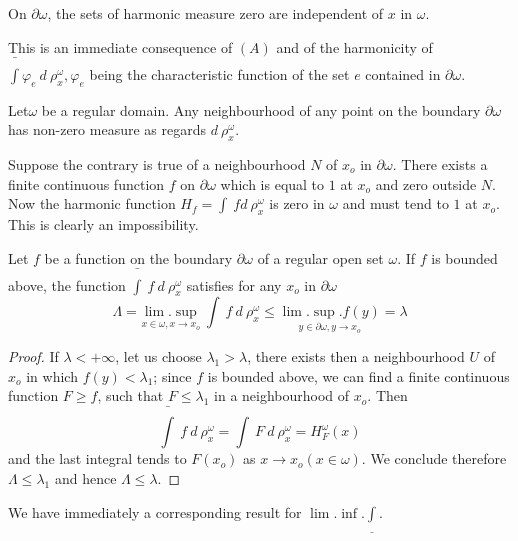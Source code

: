 \begin{coro*}%
  On $\partial \omega$, the sets of harmonic measure zero are
  independent of $x$ in $\omega$. 
\end{coro*}

This is an immediate consequence of $(A)$ and of the harmonicity of
$\bar{\int} \varphi_e ~d ~ \rho^\omega_x, \varphi_e$ being the
characteristic function of the set $e$ contained in $\partial
\omega$. 

\begin{prop}\label{p4:chap1:sec3:prop2}%
  Let\pageoriginale $\omega$ be a regular domain. Any neighbourhood of any point on
  the boundary $\partial \omega$ has non-zero measure as regards $d
  ~\rho^\omega_x$. 
\end{prop}

Suppose the contrary is true of a neighbourhood $N$ of $x_o$ in
$\partial \omega$. There exists a finite continuous function $f$ on
$\partial \omega$ which is equal to $1$ at $x_o$ and zero outside
$N$. Now the harmonic function $H_f = \int ~ fd ~ \rho^\omega_x$ is
zero in $\omega$ and must tend to $1$ at $x_o$. This is clearly an
impossibility. 

\begin{prop}\label{p4:chap1:sec3:prop3}%
  Let $f$ be a function on the boundary $\partial \omega$ of a regular
  open set $\omega$. If $f$ is bounded above, the function $\bar{\int}
  ~ f ~ d ~ \rho^\omega_x$ satisfies for any $x_o$ in $\partial
  \omega$ 
  $$
  \Lambda = \underset{x \in \omega, x \rightarrow x_o}{\lim.\sup} ~
  \int ~ f ~ d ~ \rho^\omega_x \le \underset{y \in \partial \omega, y
    \rightarrow x_o}{\lim. \sup.f(y)} = \lambda 
  $$
\end{prop}

\begin{proof}
  If $\lambda < + \infty$, let us choose $\lambda_1 > \lambda$, there
  exists then a neighbourhood $U$ of $x_o$ in which $f(y) <
  \lambda_1$; since $f$ is bounded above, we can find a finite
  continuous function $F \ge f$, such that $F \le \lambda_1$ in a
  neighbourhood of $x_o$.  Then 
  $$
  \bar{\int} ~ f ~ d ~ \rho^\omega_x = \int ~ F ~ d ~ \rho^\omega_x = H^\omega_F(x)
  $$
  and the last integral tends to $F(x_o)$ as $x \rightarrow x_o (x \in
  \omega)$. We conclude therefore $\Lambda \le \lambda_1$ and hence
  $\Lambda \le \lambda$. 
\end{proof}

We have immediately a corresponding result for $\lim.\inf.\underline{\int}$.

